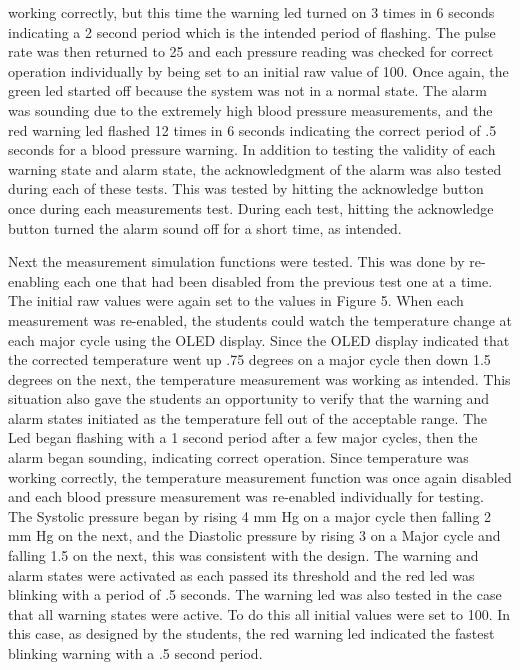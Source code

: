 \documentclass[12pt]{article} %
\begin{document}
    working correctly, but this time the warning led turned on 3 times in 6
    seconds indicating a 2 second period which is the intended period of
    flashing. The pulse rate was then returned to 25 and each pressure reading
    was checked for correct operation individually by being set to an initial
    raw value of 100. Once again, the green led started off because the system
    was not in a normal state. The alarm was sounding due to the extremely high
    blood pressure measurements, and the red warning led flashed 12 times in 6
    seconds indicating the correct period of .5 seconds for a blood pressure
    warning. In addition to testing the validity of each warning state and
    alarm state, the acknowledgment of the alarm was also tested during each
    of these tests. This was tested by hitting the acknowledge button once
    during each measurements test. During each test, hitting the acknowledge
    button turned the alarm sound off for a short time, as intended. 


    Next the measurement simulation functions were tested. This was done by
    re-enabling each one that had been disabled from the previous test one at a
    time. The initial raw values were again set to the values in Figure 5. When
    each measurement was re-enabled, the students could watch the temperature
    change at each major cycle using the OLED display. Since the OLED display
    indicated that the corrected temperature went up .75 degrees on a major
    cycle then down 1.5 degrees on the next, the temperature measurement was
    working as intended.  This situation also gave the students an opportunity
    to verify that the warning and alarm states initiated as the temperature
    fell out of the acceptable range.  The Led began flashing with a 1 second
    period after a few major cycles, then the alarm began sounding, indicating
    correct operation. Since temperature was working correctly, the temperature
    measurement function was once again disabled and each blood pressure
    measurement was re-enabled individually for testing. The Systolic pressure
    began by rising 4 mm Hg on a major cycle then falling 2 mm Hg on the next,
    and the Diastolic pressure by rising 3 on a Major cycle and falling 1.5 on
    the next, this was consistent with the design. The warning and alarm states
    were activated as each passed its threshold and the red led was blinking
    with a period of .5 seconds.  The warning led was also tested in the case
    that all warning states were active. To do this all initial values were set
    to 100. In this case, as designed by the students, the red warning led
    indicated the fastest blinking warning with a .5 second period. 
    
\end{document}
